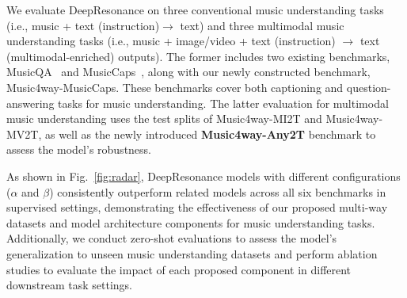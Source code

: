 We evaluate DeepResonance on three conventional music understanding tasks (i.e., music + text (instruction)$\xrightarrow{}$ text) and three multimodal music understanding tasks (i.e., music + image/video + text (instruction) $\xrightarrow{}$ text (multimodal-enriched) outputs). The former includes two existing benchmarks, MusicQA~\cite{DBLP:conf/icassp/LiuHSS24} and MusicCaps~\cite{DBLP:journals/corr/abs-2301-11325}, along with our newly constructed benchmark, Music4way-MusicCaps. These benchmarks cover both captioning and question-answering tasks for music understanding. The latter evaluation for multimodal music understanding uses the test splits of Music4way-MI2T and Music4way-MV2T, as well as the newly introduced \textbf{Music4way-Any2T} benchmark to assess the model's robustness. 

As shown in Fig.~\ref{fig:radar}, DeepResonance models with different configurations ($\alpha$ and $\beta$) consistently outperform related models across all six benchmarks in supervised settings, demonstrating the effectiveness of our proposed multi-way datasets and model architecture components for music understanding tasks. Additionally, we conduct zero-shot evaluations to assess the model's generalization to unseen music understanding datasets and perform ablation studies to evaluate the impact of each proposed component in different downstream task settings.

